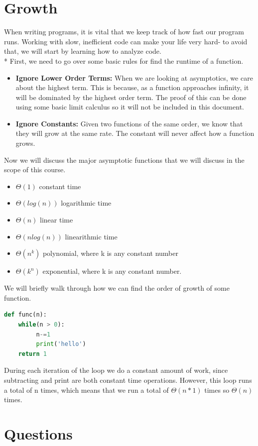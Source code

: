 \documentclass{article}
\begin{document}
\section{Growth}
When writing programs, it is vital that we keep track of how fast our program runs. Working with slow, inefficient code can make your life very hard- to avoid that, we will start by learning how to analyze code. \\* \bigskip
First, we need to go over some basic rules for find the runtime of a function. 
\begin{itemize}
\item \textbf{Ignore Lower Order Terms:} When we are looking at asymptotics, we care about the highest term. This is because, as a function approaches infinity, it will be dominated by the highest order term. The proof of this can be done using some basic limit calculus so it will not be included in this document.
\item \textbf{Ignore Constants: } Given two functions of the same order, we know that they will grow at the same rate. The constant will never affect how a function grows. 
\end{itemize}
Now we will discuss the major asymptotic functions that we will discuss in the scope of this course. 
\begin{itemize}
\item $\Theta(1)$ constant time
\item $\Theta(log(n))$ logarithmic time
\item $\Theta(n)$ linear time
\item $\Theta(nlog(n))$ linearithmic time
\item $\Theta(n^{k})$ polynomial, where k is any constant number
\item $\Theta(k^{n})$ exponential, where k is any constant number.
\end{itemize}
We will briefly walk through how we can find the order of growth of some function. 
\begin{lstlisting}[language = Python]
def func(n):
	while(n > 0):
	     n-=1
	     print('hello')
	return 1
\end{lstlisting}
During each iteration of the loop we do a constant amount of work, since subtracting and print are both constant time operations. However, this loop runs a total of n times, which means that we run a total of $\Theta(n*1)$ times so $\Theta(n)$ times.
\newpage
\section{Questions}
\end{document}
